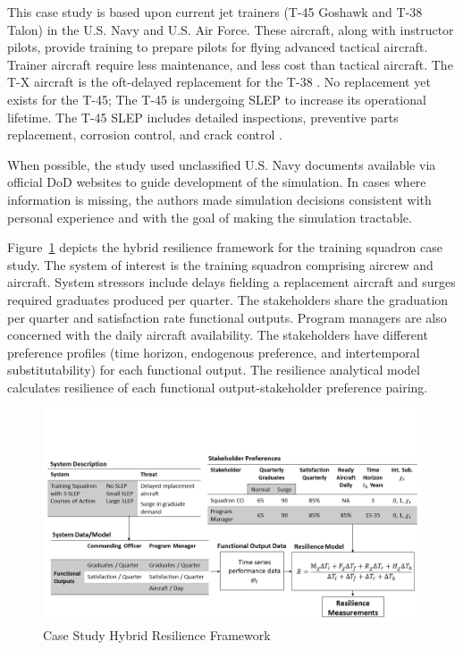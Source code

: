 \documentclass[preprint,12pt]{elsarticle}
\begin{document}
This case study is based upon current jet trainers (T-45 Goshawk and
T-38 Talon) in the U.S. Navy and U.S. Air Force. These aircraft, along
with instructor pilots, provide training to prepare pilots for flying advanced tactical
aircraft. Trainer aircraft require less maintenance, and less cost
than tactical aircraft. The T-X aircraft is the
oft-delayed replacement for the T-38 \cite{Mehta2013}. No replacement
yet exists for the T-45; The T-45 is undergoing SLEP to increase its operational
lifetime. The T-45 SLEP includes detailed inspections, preventive parts 
replacement, corrosion control, and crack control \cite{jennings2018}.

When possible, the study used unclassified U.S. Navy documents
available via official DoD websites to guide development of the
simulation. In cases where information is missing, the authors made
simulation decisions consistent with personal experience and with the
goal of making the simulation tractable.

Figure~\ref{f:FleetFramework} depicts the hybrid resilience framework
for the training squadron case study. The system of interest is the
training squadron comprising aircrew and aircraft. System stressors
include delays fielding a replacement aircraft and surges required
graduates produced per quarter. The stakeholders share the graduation
per quarter and satisfaction rate functional outputs. Program managers
are also concerned with the daily aircraft availability. The
stakeholders have different preference profiles (time horizon,
endogenous preference, and intertemporal substitutability) for each
functional output. The resilience analytical model calculates
resilience of each functional output-stakeholder preference pairing.

\begin{landscape}
\begin{figure}[h]
  \centering\includegraphics[width=8in]{CaseStudyHRF.png}
  \caption{Case Study Hybrid Resilience Framework}
  \label{f:FleetFramework}
\end{figure}
\end{landscape}
\end{document}

